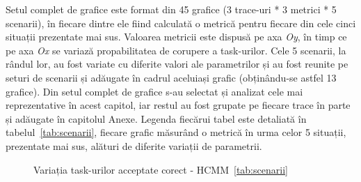 \documentclass[12pt,a4paper]{report}
\begin{document}
Setul complet de grafice este format din 45 grafice (3 trace-uri * 3 metrici * 5 scenarii), în fiecare dintre ele fiind calculată o metrică pentru fiecare din cele cinci situații prezentate mai sus. Valoarea metricii este dispusă pe axa \textit{Oy}, în timp ce pe axa \textit{Ox} se variază propabilitatea de corupere a task-urilor. Cele 5 scenarii, la rândul lor, au fost variate cu diferite valori ale parametrilor și au fost reunite pe seturi de scenarii și adăugate în cadrul aceluiași grafic (obținându-se astfel 13 grafice). Din setul complet de grafice s-au selectat și analizat cele mai reprezentative în acest capitol, iar restul au fost grupate pe fiecare trace în parte și adăugate în capitolul Anexe. Legenda fiecărui tabel este detaliată în tabelul~\ref{tab:scenarii}, fiecare grafic măsurând o metrică în urma celor 5 situații, prezentate mai sus, alături de diferite variații de parametrii.

\begin{figure}%
    \centering
    \qquad
    \caption{Variația task-urilor acceptate corect - HCMM~\ref{tab:scenarii}}%
    \label{fig:metric1HCMM}%
\end{figure}
\end{document}
